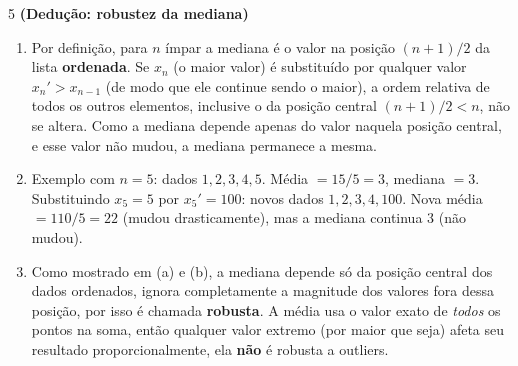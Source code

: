 \documentclass[11pt]{article}
\begin{document}
\begin{questao}{5} \textbf{(Dedução: robustez da mediana)}
\begin{solucao}
\begin{enumerate}[label=(\alph*)]
  \item Por definição, para $n$ ímpar a mediana é o valor na posição $(n+1)/2$ da lista
    \textbf{ordenada}. Se $x_n$ (o maior valor) é substituído por qualquer valor $x_n' > x_{n-1}$ (de
    modo que ele continue sendo o maior), a ordem relativa de todos os outros elementos, inclusive
    o da posição central $(n+1)/2 < n$, não se altera. Como a mediana depende apenas do valor
    naquela posição central, e esse valor não mudou, a mediana permanece a mesma.
  \item Exemplo com $n=5$: dados $1,2,3,4,5$. Média $=15/5=3$, mediana $=3$. Substituindo $x_5=5$
    por $x_5'=100$: novos dados $1,2,3,4,100$. Nova média $=110/5=22$ (mudou drasticamente),
    mas a mediana continua $3$ (não mudou).
  \item Como mostrado em (a) e (b), a mediana depende só da posição central dos dados ordenados,
    ignora completamente a magnitude dos valores fora dessa posição, por isso é chamada
    \textbf{robusta}. A média usa o valor exato de \emph{todos} os pontos na soma, então qualquer
    valor extremo (por maior que seja) afeta seu resultado proporcionalmente, ela \textbf{não} é
    robusta a outliers.
\end{enumerate}
\end{solucao}
\end{questao}
\end{document}
